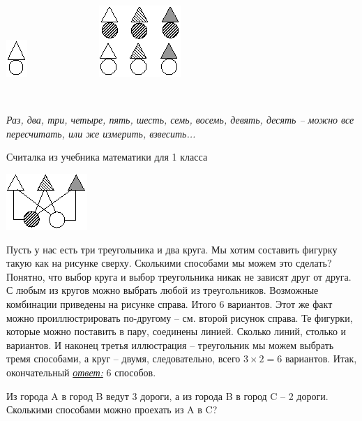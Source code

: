 \begin{floatingfigure}[l]{0\textwidth}
	
	\includegraphics[scale=9.6]{./img/tr}~~~~~~~~~~~~~~
	\includegraphics[scale=5.7]{./img/tre}
\end{floatingfigure}~

\epigraph{\textit{Раз, два, три, четыре, пять, шесть, семь, восемь, девять, десять –
		можно все пересчитать, или же измерить, взвесить...
}}{Считалка из учебника математики для 1 класса}

\begin{floatingfigure}[r]{0.25\textwidth}
	\includegraphics[scale=8]{./img/komb}
\end{floatingfigure}
Пусть у нас есть три треугольника и два круга. Мы хотим составить фигурку такую как на рисунке сверху. Сколькими способами мы можем это сделать? Понятно, что выбор круга и выбор треугольника никак не зависят друг от друга. С любым из кругов можно выбрать любой из треугольников. Возможные комбинации приведены на рисунке справа. Итого 6 вариантов. Этот же факт можно проиллюстрировать по-другому – см. второй рисунок справа. Те фигурки, которые можно поставить в пару, соединены линией. Сколько линий, столько и вариантов. И наконец третья иллюстрация – треугольник мы можем выбрать тремя способами, а круг – двумя, следовательно, всего $3 \times 2 = 6$ вариантов. Итак, окончательный \underline{\textit{ответ:}} 6 способов.

\begin{thm}
	Из города A в город B ведут 3 дороги, а из города B в город C – 2 дороги. Сколькими способами можно проехать из A в C? 
\end{thm}

